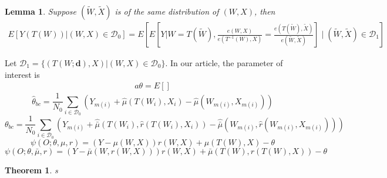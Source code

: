 \documentclass{article}
\newtheorem{theorem}{Theorem}
\newtheorem{lemma}{Lemma}
\theoremstyle{definition}
\newtheorem{proof of proposition}{Proof of Proposition}
\begin{document}
\begin{lemma} 
Suppose $(\tilde{W},\tilde{X})$ is of the same distribution of $(W,X)$, then
\begin{align}
E[Y(T(W))|(W,X) \in \mathcal{D}_0]=E\left[E\left[Y|W=T(\tilde{W}),\frac{e(W,X)}{e(T^{-1}(W),X)}=\frac{e(T(\tilde{W}),\tilde{X})}{e(\tilde{W},\tilde{X})}\right]\mid (\tilde{W},\tilde{X})\in\mathcal{D}_1\right]
\end{align}
\end{lemma}
Let $\mathcal{D}_1=\{(T(W;\mathbf{d}),X)|(W,X) \in \mathcal{D}_0\}$.  In our article, the parameter of interest is 
\begin{align}
    a\theta=E[]
\end{align}
$$\hat{\theta}_{bc}=\frac{1}{N_0}\sum\limits_{i \in \mathcal{D}_0}(Y_{m(i)}+\hat{\mu}(T(W_i),X_i)-\hat{\mu}(W_{m(i)},X_{m(i)}))$$
$$\theta_{bc}=\frac{1}{N_0}\sum\limits_{i \in \mathcal{D}_0}(Y_{m(i)}+\hat{\bar{\mu}}(T(W_i),\hat{r}(T(W_i),X_i))-\hat{\bar{\mu}}(W_{m(i)},\hat{r}(W_{m(i)},X_{m(i)})))$$
$$\psi(O;\theta,\mu,r)=(Y-\mu(W,X))r(W,X)+\mu(T(W),X)-\theta$$
$$\psi(O;\theta,\bar{\mu},r)=(Y-\bar{\mu}(W,r(W,X)))r(W,X)+\bar{\mu}(T(W),r(T(W),X))-\theta$$
\begin{theorem}
    s
\end{theorem}
\end{document}
